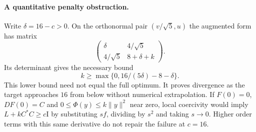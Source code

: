 \documentclass[11pt]{article}
\providecommand{\id}{\mathrm I}
\begin{document}
\paragraph{A quantitative penalty obstruction.}
Write $\delta=16-c>0$. On the orthonormal pair $(v/\sqrt5,u)$ the
augmented form has matrix
\[
 \begin{pmatrix}\delta&4/\sqrt5\\4/\sqrt5&8+\delta+k\end{pmatrix}.
\]
Its determinant gives the necessary bound
\begin{equation}\label{mx:eq:blowup}
 k\geq\max\{0,16/(5\delta)-8-\delta\}.
\end{equation}
This lower bound need not equal the full optimum. It proves divergence
as the target approaches $16$ from below without numerical extrapolation.
If $F(0)=0$, $DF(0)=C$ and $0\leq\Phi(y)\leq k\|y\|^2$ near zero,
local coercivity would imply $L+kC^*C\geq c\id$ by substituting $sf$,
dividing by $s^2$ and taking $s\to0$. Higher order terms with this same
derivative do not repair the failure at $c=16$.
\end{document}
